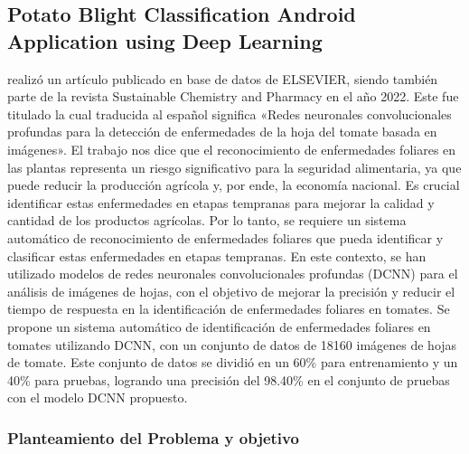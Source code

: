 \subsection{Potato Blight Classification Android Application using Deep Learning  \citep*{antecedente7}}

\citeauthor{antecedente7} realizó un artículo publicado en base de datos de ELSEVIER, siendo también parte de la revista Sustainable Chemistry and Pharmacy en el año 2022. Este fue titulado  la cual traducida al español significa «Redes neuronales convolucionales profundas para la detección de enfermedades de la hoja del tomate basada en imágenes». El trabajo nos dice que el reconocimiento de enfermedades foliares en las plantas representa un riesgo significativo para la seguridad alimentaria, ya que puede reducir la producción agrícola y, por ende, la economía nacional. Es crucial identificar estas enfermedades en etapas tempranas para mejorar la calidad y cantidad de los productos agrícolas. Por lo tanto, se requiere un sistema automático de reconocimiento de enfermedades foliares que pueda identificar y clasificar estas enfermedades en etapas tempranas. En este contexto, se han utilizado modelos de redes neuronales convolucionales profundas (DCNN) para el análisis de imágenes de hojas, con el objetivo de mejorar la precisión y reducir el tiempo de respuesta en la identificación de enfermedades foliares en tomates. Se propone un sistema automático de identificación de enfermedades foliares en tomates utilizando DCNN, con un conjunto de datos de 18160 imágenes de hojas de tomate. Este conjunto de datos se dividió en un 60\% para entrenamiento y un 40\% para pruebas, logrando una precisión del 98.40\% en el conjunto de pruebas con el modelo DCNN propuesto.

\subsubsection{Planteamiento del Problema y objetivo }

